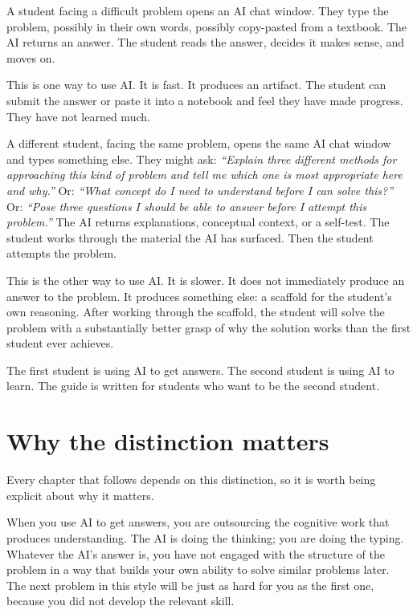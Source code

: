 \documentclass[11pt]{book}
\begin{document}
\medskip

A student facing a difficult problem opens an AI chat window. They type the problem, possibly in their own words, possibly copy-pasted from a textbook. The AI returns an answer. The student reads the answer, decides it makes sense, and moves on.

This is one way to use AI. It is fast. It produces an artifact. The student can submit the answer or paste it into a notebook and feel they have made progress. They have not learned much.

A different student, facing the same problem, opens the same AI chat window and types something else. They might ask: \emph{``Explain three different methods for approaching this kind of problem and tell me which one is most appropriate here and why.''} Or: \emph{``What concept do I need to understand before I can solve this?''} Or: \emph{``Pose three questions I should be able to answer before I attempt this problem.''} The AI returns explanations, conceptual context, or a self-test. The student works through the material the AI has surfaced. Then the student attempts the problem.

This is the other way to use AI. It is slower. It does not immediately produce an answer to the problem. It produces something else: a scaffold for the student's own reasoning. After working through the scaffold, the student will solve the problem with a substantially better grasp of why the solution works than the first student ever achieves.

The first student is using AI to get answers. The second student is using AI to learn. The guide is written for students who want to be the second student.

\section{Why the distinction matters}

Every chapter that follows depends on this distinction, so it is worth being explicit about why it matters.

When you use AI to get answers, you are outsourcing the cognitive work that produces understanding. The AI is doing the thinking; you are doing the typing. Whatever the AI's answer is, you have not engaged with the structure of the problem in a way that builds your own ability to solve similar problems later. The next problem in this style will be just as hard for you as the first one, because you did not develop the relevant skill.
\end{document}
